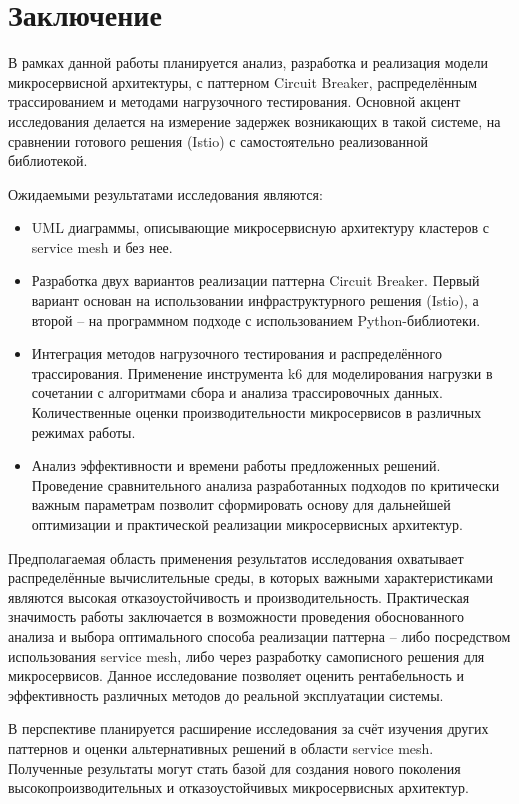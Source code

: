 \chapter*{Заключение}


В рамках данной работы планируется анализ, разработка и реализация модели микросервисной архитектуры, с паттерном Circuit Breaker, распределённым трассированием и методами нагрузочного тестирования. Основной акцент исследования делается на измерение задержек возникающих в такой системе, на сравнении готового решения (Istio) с самостоятельно реализованной библиотекой.

Ожидаемыми результатами исследования являются:
\begin{itemize}
    \item UML диаграммы, описывающие микросервисную архитектуру кластеров с service mesh и без нее. 
    \item Разработка двух вариантов реализации паттерна Circuit Breaker. Первый вариант основан на использовании инфраструктурного решения (Istio), а второй – на программном подходе с использованием Python-библиотеки. 
    \item Интеграция методов нагрузочного тестирования и распределённого трассирования. Применение инструмента k6 для моделирования нагрузки в сочетании с алгоритмами сбора и анализа трассировочных данных. Количественные оценки производительности микросервисов в различных режимах работы.
    \item Анализ эффективности и времени работы предложенных решений. Проведение сравнительного анализа разработанных подходов по критически важным параметрам позволит сформировать основу для дальнейшей оптимизации и практической реализации микросервисных архитектур. 
\end{itemize}

Предполагаемая область применения результатов исследования охватывает распределённые вычислительные среды, в которых важными характеристиками являются высокая отказоустойчивость и производительность. Практическая значимость работы заключается в возможности проведения обоснованного анализа и выбора оптимального способа реализации паттерна – либо посредством использования service mesh, либо через разработку самописного решения для микросервисов. Данное исследование позволяет оценить рентабельность и эффективность различных методов до реальной эксплуатации системы.

В перспективе планируется расширение исследования за счёт изучения других паттернов и оценки альтернативных решений в области service mesh. Полученные результаты могут стать базой для создания нового поколения высокопроизводительных и отказоустойчивых микросервисных архитектур.

